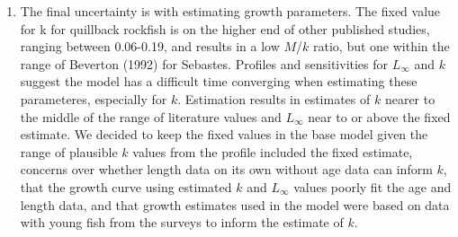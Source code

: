 \documentclass[11pt,
  english,
  a4paper,
]{article}
\begin{document}
\begin{enumerate}
  \leavevmode\tagmcend\tagstructend\par
\item

  The final uncertainty is with estimating growth parameters. The fixed value for k for quillback rockfish is on the higher end of other published studies, ranging between 0.06-0.19, and results in a low {\(M\)\leavevmode\tagmcend\tagstructend}/{\(k\)\leavevmode\tagmcend\tagstructend} ratio, but one within the range of Beverton {(1992)\leavevmode\tagmcend\tagstructend} for Sebastes. Profiles and sensitivities for {\(L_{\infty}\)\leavevmode\tagmcend\tagstructend} and {\(k\)\leavevmode\tagmcend\tagstructend} suggest the model has a difficult time converging when estimating these parameteres, especially for {\(k\)\leavevmode\tagmcend\tagstructend}. Estimation results in estimates of {\(k\)\leavevmode\tagmcend\tagstructend} nearer to the middle of the range of literature values and {\(L_{\infty}\)\leavevmode\tagmcend\tagstructend} near to or above the fixed estimate. We decided to keep the fixed values in the base model given the range of plausible {\(k\)\leavevmode\tagmcend\tagstructend} values from the profile included the fixed estimate, concerns over whether length data on its own without age data can inform {\(k\)\leavevmode\tagmcend\tagstructend}, that the growth curve using estimated {\(k\)\leavevmode\tagmcend\tagstructend} and {\(L_{\infty}\)\leavevmode\tagmcend\tagstructend} values poorly fit the age and length data, and that growth estimates used in the model were based on data with young fish from the surveys to inform the estimate of {\(k\)\leavevmode\tagmcend\tagstructend}.

  \leavevmode\tagmcend\tagstructend\par
\end{enumerate}
\end{document}
